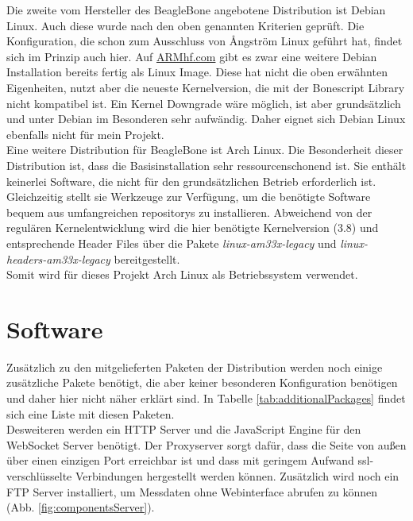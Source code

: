 Die zweite vom Hersteller des BeagleBone angebotene Distribution ist Debian Linux. Auch diese wurde nach den oben genannten Kriterien geprüft. Die Konfiguration, die schon zum Ausschluss von {\AA}ngström Linux geführt hat, findet sich im Prinzip auch hier. Auf \href{http://www.armhf.com/}{ARMhf.com} gibt es zwar eine weitere Debian Installation bereits fertig als Linux Image. Diese hat nicht die oben erwähnten Eigenheiten, nutzt aber die neueste Kernelversion, die mit der Bonescript Library nicht kompatibel ist. Ein Kernel Downgrade wäre möglich, ist aber grundsätzlich und unter Debian im Besonderen sehr aufwändig. Daher eignet sich Debian Linux ebenfalls nicht für mein Projekt.\\

Eine weitere Distribution für BeagleBone ist Arch Linux. Die Besonderheit dieser Distribution ist, dass die Basisinstallation sehr ressourcenschonend ist. Sie enthält keinerlei Software, die nicht für den grundsätzlichen Betrieb erforderlich ist. Gleichzeitig stellt sie Werkzeuge zur Verfügung, um die benötigte Software bequem aus umfangreichen \glspl{repository} zu installieren. Abweichend von der regulären Kernelentwicklung wird die hier benötigte Kernelversion (3.8) und entsprechende Header Files über die Pakete \textit{linux-am33x-legacy} und \textit{linux-headers-am33x-legacy} bereitgestellt.\\

Somit wird für dieses Projekt Arch Linux als Betriebssystem verwendet.


\section{Software}

Zusätzlich zu den mitgelieferten Paketen der Distribution werden noch einige zusätzliche Pakete benötigt, die aber keiner besonderen Konfiguration benötigen und daher hier nicht näher erklärt sind. In Tabelle \ref{tab:additionalPackages} findet sich eine Liste mit diesen Paketen.\\

Desweiteren werden ein HTTP Server und die JavaScript Engine für den WebSocket Server benötigt. Der Proxyserver sorgt dafür, dass die Seite von außen über einen einzigen Port erreichbar ist und dass mit geringem Aufwand \gls{ssl}-verschlüsselte Verbindungen hergestellt werden können. Zusätzlich wird noch ein FTP Server installiert, um Messdaten ohne Webinterface abrufen zu können (Abb. \ref{fig:componentsServer}).

